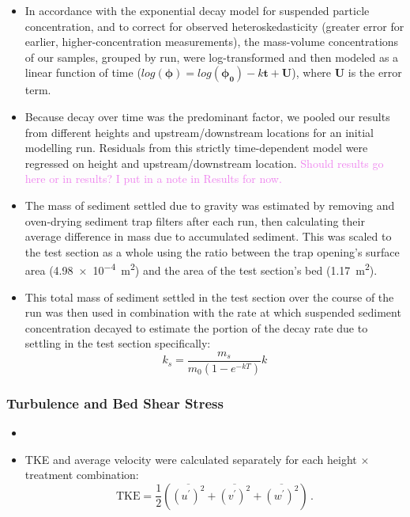 \documentclass{article}
\begin{document}
\begin{itemize}
    \item In accordance with the exponential decay model for suspended particle concentration, and to correct for observed heteroskedasticity (greater error for earlier, higher-concentration measurements), the mass-volume concentrations of our samples, grouped by run, were log-transformed and then modeled as a linear function of time ($log(\bm{\phi}) = log(\bm{\phi_0}) - k\bm{t} + \bm{U}$), where $\bm{U}$ is the error term. 
    \item Because decay over time was the predominant factor, we pooled our results from different heights and upstream/downstream locations for an initial modelling run. Residuals from this strictly time-dependent model were regressed on height and upstream/downstream location. \textcolor{violet}{Should results go here or in results? I put in a note in Results for now.} 
    \item The mass of sediment settled due to gravity was estimated by removing and oven-drying sediment trap filters after each run, then calculating their average difference in mass due to accumulated sediment. This was scaled to the test section as a whole using the ratio between the trap opening's surface area (\SI{4.98e-4}{\metre^2}) and the area of the test section's bed (\SI{1.17}{\metre^2}). 
    \item This total mass of sediment settled in the test section over the course of the run was then used in combination with the rate at which suspended sediment concentration decayed to estimate the portion of the decay rate due to settling in the test section specifically:
    \begin{equation}
        k_s = \frac{m_s}{m_0(1-e^{-kT})}k
    \end{equation}
\end{itemize}

\subsubsection{Turbulence and Bed Shear Stress}

\begin{itemize}
    \item 
    \item TKE and average velocity were calculated separately for each height $\times$ treatment combination:
\begin{equation}
    \text{TKE} = \frac{1}{2}(\overline{(u^\prime)^2} + \overline{(v^\prime)^2} + \overline{(w^\prime)^2})\,.
    \label{eqn:TKE}
\end{equation}

\end{itemize}
\end{document}
